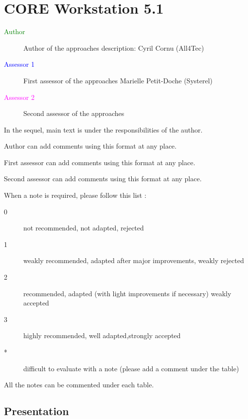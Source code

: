 \chapter{CORE Workstation 5.1}

\begin{description}
\item[\textcolor{green}{Author}] Author of the approaches description: Cyril Cornu (All4Tec)
\item[\textcolor{blue}{Assessor 1}] First assessor of the approaches Marielle Petit-Doche (Systerel)
\item[\textcolor{magenta}{Assessor 2}] Second assessor of the approaches 
\end{description}

In the sequel, main text is under the responsibilities of the author.

\begin{author_comment}
Author can add comments using this format at any place.
\end{author_comment}

\begin{assessor1}
First assessor can add comments using this format at any place.
\end{assessor1}

\begin{assessor2}
Second assessor can add comments using this format at any place.
\end{assessor2}

When a note is required, please follow this list :
\begin{description}
\item[0] not recommended, not adapted, rejected
\item[1] weakly recommended, adapted after major improvements, weakly rejected
\item[2] recommended, adapted (with light improvements if necessary)  weakly accepted
\item[3] highly recommended, well adapted,strongly accepted
\item[*] difficult to evaluate with a note (please add a comment under the table)
\end{description}

All the notes can be commented under each table.

\section{Presentation}

